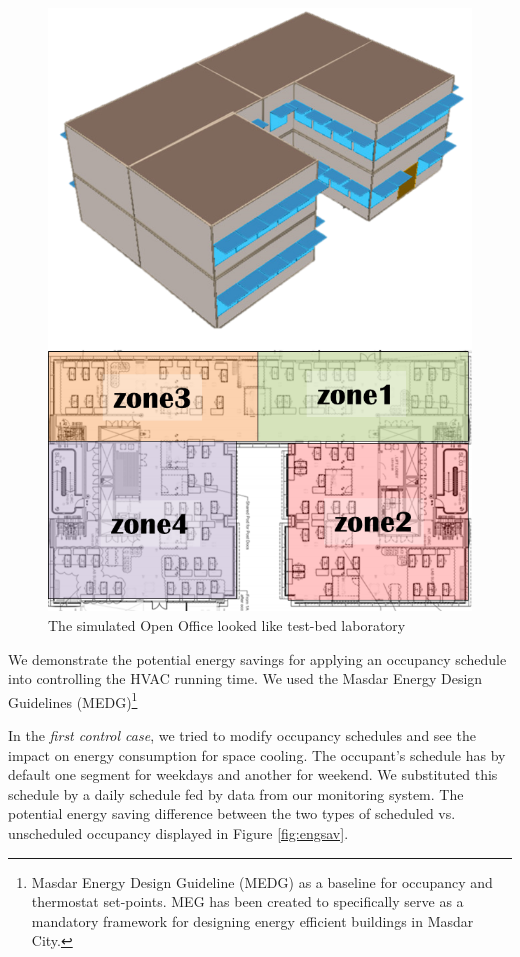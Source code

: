 \begin{figure}[!ht]
  \centering
 	  	\includegraphics[width=0.9\columnwidth]{./images/zonedivided.png}
  \caption{The simulated Open Office looked like test-bed laboratory}\label{fig:simdesign}
\end{figure}


We demonstrate the potential energy savings for applying an occupancy schedule into controlling the HVAC running time. We used the Masdar Energy Design Guidelines (MEDG)\footnote{Masdar Energy Design Guideline (MEDG) as a baseline for occupancy and thermostat set-points. MEG has been created to specifically serve as a mandatory framework for designing energy efficient buildings in Masdar City.}

In the {\em first control case}, we tried to modify occupancy schedules and see the impact on energy consumption for space cooling.  The occupant's schedule  has by default one segment for weekdays and another for weekend. We substituted this schedule by a daily schedule  fed by data from our monitoring system. The potential energy saving difference between the two types of  scheduled  vs. unscheduled occupancy displayed in Figure \ref{fig:engsav}.


